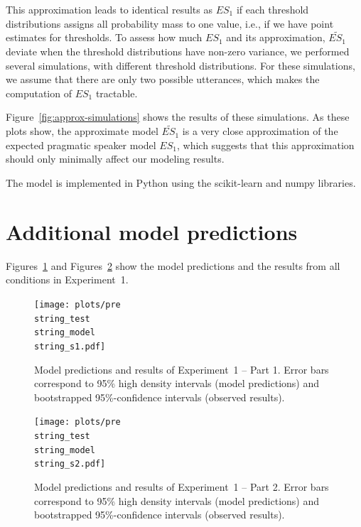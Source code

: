 \documentclass[man, floatsintext]{apa6}
\begin{document}
This approximation leads to identical results as $ES_1$ if each threshold distributions assigns all probability mass to one value, 
i.e., if we have point estimates for thresholds. To assess how much $ES_1$ and its approximation, $\widetilde{ES_1}$ deviate when 
the threshold distributions have non-zero variance, we performed several simulations, with different threshold distributions. For these
simulations, we assume that there are only two possible utterances, which makes the computation of $ES_1$ tractable.

Figure~\ref{fig:approx-simulations} shows the results of these simulations. As these plots show, the approximate model $\widetilde{ES_1}$ is a very close approximation of the expected
pragmatic speaker model $ES_1$, which suggests that this approximation should only minimally affect our modeling results. 

The model is implemented in Python using the scikit-learn \parencite{Scikit2011} and numpy \parencite{vanderWalt2011} libraries.

\section{Additional model predictions}
\setcounter{section}{4}

Figures~\ref{fig:norming-results-model-1} and Figures~\ref{fig:norming-results-model-2} show the model predictions and the results from all conditions in Experiment~1. 

\begin{figure}[h!]
\texttt{[image: plots/pre\\string\_test\\string\_model\\string\_s1.pdf]}
\caption{Model predictions and results of Experiment~1 -- Part 1. Error bars correspond to 95\% high density intervals (model predictions) and bootstrapped 95\%-confidence intervals (observed results). \label{fig:norming-results-model-1}}

\end{figure}

\begin{figure}[h!]
\texttt{[image: plots/pre\\string\_test\\string\_model\\string\_s2.pdf]}
\caption{Model predictions and results of Experiment~1  -- Part 2. Error bars correspond to 95\% high density intervals (model predictions) and bootstrapped 95\%-confidence intervals (observed results). \label{fig:norming-results-model-2}}

\end{figure}
\end{document}
